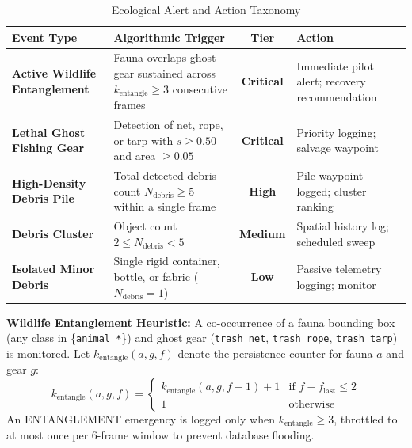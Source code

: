 \documentclass[conference]{IEEEtran}
\begin{document}
\begin{table}[htbp]
\caption{Ecological Alert and Action Taxonomy}
\label{tab:alert_taxonomy}
\centering
\begin{tabular}{p{2.1cm}p{2.8cm}cp{1.8cm}}
\toprule
\textbf{Event Type} & \textbf{Algorithmic Trigger} & \textbf{Tier} & \textbf{Action} \\
\midrule
\textbf{Active Wildlife Entanglement} & Fauna overlaps ghost gear sustained across $k_{\text{entangle}} \ge 3$ consecutive frames & \textbf{Critical} & Immediate pilot alert; recovery recommendation \\
\textbf{Lethal Ghost Fishing Gear} & Detection of net, rope, or tarp with $s \ge 0.50$ and area $\ge 0.05$ & \textbf{Critical} & Priority logging; salvage waypoint \\
\textbf{High-Density Debris Pile} & Total detected debris count $N_{\text{debris}} \ge 5$ within a single frame & \textbf{High} & Pile waypoint logged; cluster ranking \\
\textbf{Debris Cluster} & Object count $2 \le N_{\text{debris}} < 5$ & \textbf{Medium} & Spatial history log; scheduled sweep \\
\textbf{Isolated Minor Debris} & Single rigid container, bottle, or fabric ($N_{\text{debris}} = 1$) & \textbf{Low} & Passive telemetry logging; monitor \\
\bottomrule
\end{tabular}
\end{table}

\textbf{Wildlife Entanglement Heuristic:} A co-occurrence of a fauna bounding box (any class in \{\texttt{animal\_*}\}) and ghost gear (\texttt{trash\_net}, \texttt{trash\_rope}, \texttt{trash\_tarp}) is monitored. Let $k_{\text{entangle}}(a, g, f)$ denote the persistence counter for fauna $a$ and gear $g$:
\begin{equation}
k_{\text{entangle}}(a, g, f) = \begin{cases} k_{\text{entangle}}(a, g, f-1) + 1 & \text{if } f - f_{\text{last}} \le 2 \\ 1 & \text{otherwise} \end{cases}
\label{eq:entangle_gate}
\end{equation}
An ENTANGLEMENT emergency is logged only when $k_{\text{entangle}} \ge 3$, throttled to at most once per 6-frame window to prevent database flooding.
\end{document}
